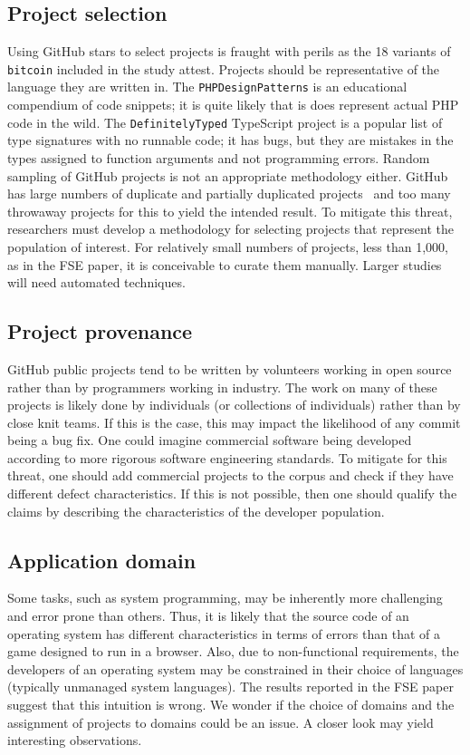 \documentclass[acmsmall]{acmart}
\newcommand{\ts}{{\sf  TypeScript}\xspace}
\newcommand{\php}{{\sf  PHP}\xspace}
\newcommand{\gh}{{GitHub}\xspace}
\newcommand{\code}[1]{{\tt\small #1}\xspace}
\begin{document}
\subsection{Project selection} 

Using \gh stars to select projects is fraught with perils as the 18 variants
of \code{bitcoin} included in the study attest.  Projects should be
representative of the language they are written in.  The
\code{PHP\-Design\-Patterns} is an educational compendium of code snippets;
it is quite likely that is does represent actual \php code in the wild.  The
\code{Definitely\-Typed} \ts project is a popular list of type signatures
with no runnable code; it has bugs, but they are mistakes in the types
assigned to function arguments and not programming errors.  Random sampling
of \gh projects is not an appropriate methodology either. \gh has large
numbers of duplicate and partially duplicated projects~\cite{oopsla17a} and
too many throwaway projects for this to yield the intended result.  To
mitigate this threat, researchers must develop a methodology for selecting
projects that represent the population of interest. For relatively small
numbers of projects, less than 1,000, as in the FSE paper, it is conceivable
to curate them manually. Larger studies will need automated techniques.

\subsection{Project provenance} 

\gh public projects tend to be written by volunteers working in open source
rather than by programmers working in industry. The work on many of these
projects is likely done by individuals (or collections of individuals)
rather than by close knit teams. If this is the case, this may impact the
likelihood of any commit being a bug fix. One could imagine commercial
software being developed according to more rigorous software engineering
standards.  To mitigate for this threat, one should add commercial projects
to the corpus and check if they have different defect characteristics.
If this is not possible, then one should qualify the claims by describing
the characteristics of the developer population.

\subsection{Application domain} 

Some tasks, such as system programming, may be inherently more challenging and
error prone than others. Thus, it is likely that the source code of an
operating system has different characteristics in terms of errors than
that of a game designed to run in a browser. Also, due to non-functional
requirements, the developers of an operating system may be constrained in
their choice of languages (typically unmanaged system languages).  The
results reported in the FSE paper suggest that this intuition is wrong.  We
wonder if the choice of domains and the assignment of projects to domains
could be an issue. A closer look may yield interesting observations.
\end{document}
